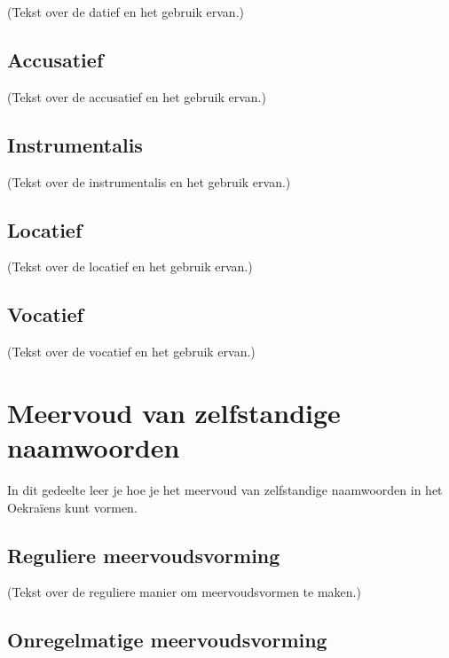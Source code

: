 \documentclass[
  letterpaper,
  DIV=11,
  numbers=noendperiod]{scrreprt}
\begin{document}
(Tekst over de datief en het gebruik ervan.)

\hypertarget{accusatief}{%
\subsection{Accusatief}\label{accusatief}}

(Tekst over de accusatief en het gebruik ervan.)

\hypertarget{instrumentalis}{%
\subsection{Instrumentalis}\label{instrumentalis}}

(Tekst over de instrumentalis en het gebruik ervan.)

\hypertarget{locatief}{%
\subsection{Locatief}\label{locatief}}

(Tekst over de locatief en het gebruik ervan.)

\hypertarget{vocatief}{%
\subsection{Vocatief}\label{vocatief}}

(Tekst over de vocatief en het gebruik ervan.)

\hypertarget{meervoud-van-zelfstandige-naamwoorden}{%
\section{Meervoud van zelfstandige
naamwoorden}\label{meervoud-van-zelfstandige-naamwoorden}}

In dit gedeelte leer je hoe je het meervoud van zelfstandige naamwoorden
in het Oekraïens kunt vormen.

\hypertarget{reguliere-meervoudsvorming}{%
\subsection{Reguliere
meervoudsvorming}\label{reguliere-meervoudsvorming}}

(Tekst over de reguliere manier om meervoudsvormen te maken.)

\hypertarget{onregelmatige-meervoudsvorming}{%
\subsection{Onregelmatige
meervoudsvorming}\label{onregelmatige-meervoudsvorming}}
\end{document}
